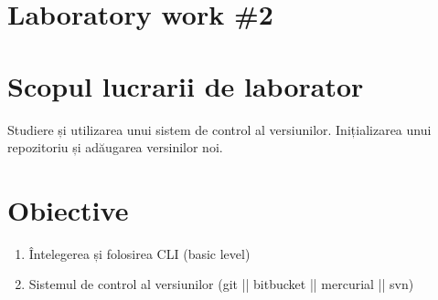 \section*{Laboratory work \#2}

\section{Scopul lucrarii de laborator}
Studiere și utilizarea unui sistem de control al versiunilor. Inițializarea unui repozitoriu și adăugarea versinilor noi.
\section{Obiective}

\begin{enumerate}
\item Întelegerea și folosirea CLI (basic level)
\item Sistemul de control al versiunilor (git || bitbucket || mercurial || svn)
\end{enumerate}

\clearpage